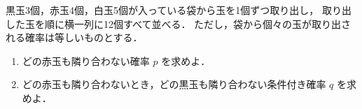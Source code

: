 ﻿\documentclass[../../../uem_tok_q.tex]{subfiles}
\begin{document}
    黒玉3個，赤玉4個，白玉5個が入っている袋から玉を1個ずつ取り出し，%
    取り出した玉を順に横一列に12個すべて並べる．%
    ただし，袋から個々の玉が取り出される確率は等しいものとする．

    \begin{enumerate}
        \item どの赤玉も隣り合わない確率 $p$ を求めよ．
        \item どの赤玉も隣り合わないとき，どの黒玉も隣り合わない条件付き確率 $q$ を求めよ．
    \end{enumerate}
\end{document}
